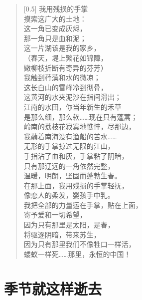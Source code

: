 \documentclass[12pt,UTF-8,openany]{ctexbook}
\begin{document}
\begin{normalsize}
    
    \begin{verse}[0.5\linewidth]
        我用残损的手掌 \\
        摸索这广大的土地： \\
        这一角已变成灰烬， \\
        那一角只是血和泥； \\
        这一片湖该是我的家乡， \\
        （春天，堤上繁花如锦障， \\
        嫩柳枝折断有奇异的芬芳） \\
        我触到荇藻和水的微凉； \\
        这长白山的雪峰冷到彻骨， \\
        这黄河的水夹泥沙在指间滑出； \\
        江南的水田，你当年新生的禾草 \\
        是那么细，那么软……现在只有蓬蒿； \\
        岭南的荔枝花寂寞地憔悴，尽那边， \\
        我蘸着南海没有渔船的苦水…… \\
        无形的手掌掠过无限的江山， \\
        手指沾了血和灰，手掌粘了阴暗， \\
        只有那辽远的一角依然完整， \\
        温暖，明朗，坚固而蓬勃生春。 \\
        在那上面，我用残损的手掌轻抚， \\
        像恋人的柔发，婴孩手中乳。 \\
        我把全部的力量运在手掌，贴在上面， \\
        寄予爱和一切希望， \\
        因为只有那里是太阳，是春， \\
        将驱逐阴暗，带来苏生， \\
        因为只有那里我们不像牲口一样活， \\
        蝼蚁一样死……那里，永恒的中国！
    \end{verse}
    
\end{normalsize}



\chapter{季节就这样逝去}
\end{document}
